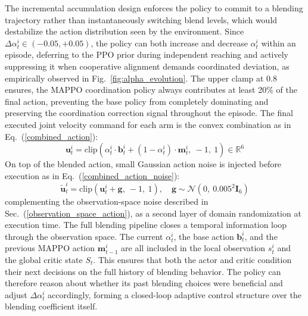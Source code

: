 \documentclass[a4paper,fleqn]{cas-dc}
\begin{document}
The incremental accumulation design enforces the policy to commit to a blending trajectory rather than instantaneously switching blend levels, which would destabilize the action distribution seen by the environment. Since $\Delta \alpha_t^i \in (-0.05, +0.05)$, the policy can both increase and decrease $\alpha_t^i$ within an episode, deferring to the PPO prior during independent reaching and actively suppressing it when cooperative alignment demands coordinated deviation, as empirically observed in Fig.~\ref{fig:alpha_evolution}. The upper clamp at 0.8 ensures, the MAPPO coordination policy always contributes at least 20\% of the final action, preventing the base policy from completely dominating and preserving the coordination correction signal throughout the episode. The final executed joint velocity command for each arm is the convex combination as in Eq.~(\ref{combined_action}):
\begin{equation}
\mathbf{u}_t^i = \mathrm{clip}\left( \alpha_t^i \cdot \mathbf{b}_t^i + (1 - \alpha_t^i)\cdot \mathbf{m}_t^i,\ -1,\ 1 \right) \in \mathbb{R}^6
\label{combined_action}
\end{equation}
On top of the blended action, small Gaussian action noise is injected before execution as in Eq.~(\ref{combined_action_noise}):
\begin{equation}
\mathbf{\tilde{u}}_t^i = \mathrm{clip}\left( \mathbf{u}_t^i + \mathbf{g},\ -1,\ 1 \right),
\quad
\mathbf{g} \sim \mathcal{N}\left( 0,\ 0.005^2 \mathbf{I}_6 \right)
\label{combined_action_noise}
\end{equation}
complementing the observation-space noise described in Sec.~(\ref{observation_space_action}), as a second layer of domain randomization at execution time. The full blending pipeline closes a temporal information loop through the observation space. The current $\alpha_t^i$, the base action $\mathbf{b}_t^i$, and the previous MAPPO action $\mathbf{m}_{t-1}^i$ are all included in the local observation $s_t^i$ and the global critic state $S_t$. This ensures that both the actor and critic condition their next decisions on the full history of blending behavior. The policy can therefore reason about whether its past blending choices were beneficial and adjust $\Delta\alpha_t^i$ accordingly, forming a closed-loop adaptive control structure over the blending coefficient itself.
\end{document}

